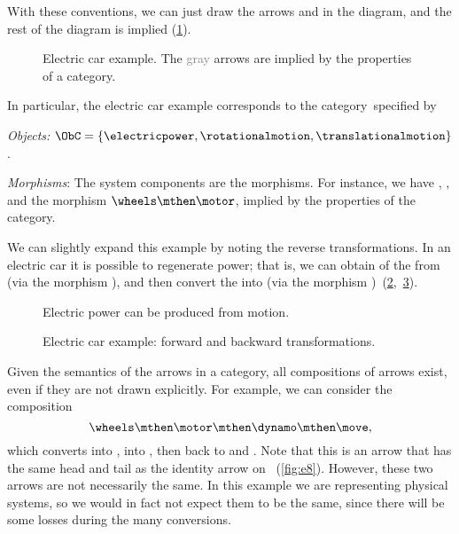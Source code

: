With these conventions, we can just draw the arrows \motor and \wheels in the diagram, and the rest of the diagram is implied (\cref{fig:e5}).

\begin{figure}[h!]
    \centering
    \caption{
        Electric car example.
        The \textcolor{gray}{gray} arrows are implied by the properties
        of a category.
    }
    \label{fig:e5}
\end{figure}

In particular, the electric car example corresponds to the category~\CatC specified by
\begin{compactitem}
    \item \emph{Objects:} $\ObC=\{ \electricpower,\rotationalmotion,\translationalmotion\}$.
    \item \emph{Morphisms}: The system components are the morphisms. For instance, we have \motor, \wheels, and the morphism $\wheels \mthen \motor$, implied by the properties of the category.
\end{compactitem}

We can slightly expand this example by noting the reverse transformations. In an electric car
it is possible to regenerate power; that is, we can obtain \rotationalmotion of the \wheels from
\translationalmotion (via the morphism \move), and then convert the \rotationalmotion into \electricpower (via the morphism \dynamo)~(\cref{fig:e6},~\cref{fig:e6-together}).

\begin{figure}[h!]
    \centering
    \caption{Electric power can be produced from motion.}
    \label{fig:e6}
\end{figure}

\begin{figure}[h!]
    \centering
    \caption{Electric car example: forward and backward transformations.\label{fig:e6-together}}
\end{figure}
Given the semantics of the arrows in a category, all compositions of arrows exist, even if they are not drawn
explicitly. For example, we can consider the composition
\begin{equation*}
    \wheels \mthen \motor \mthen \dynamo \mthen \move,
\end{equation*}
which converts \translationalmotion into \rotationalmotion, into \electricpower, then back to
\rotationalmotion and \translationalmotion. Note that this is an arrow that has the same head and tail as the identity arrow on \translationalmotion~(\cref{fig:e8}). However, these two arrows are not necessarily the same. In this example we are representing physical systems, so we would in fact not expect them to be the same, since there will be some losses during the many conversions.

